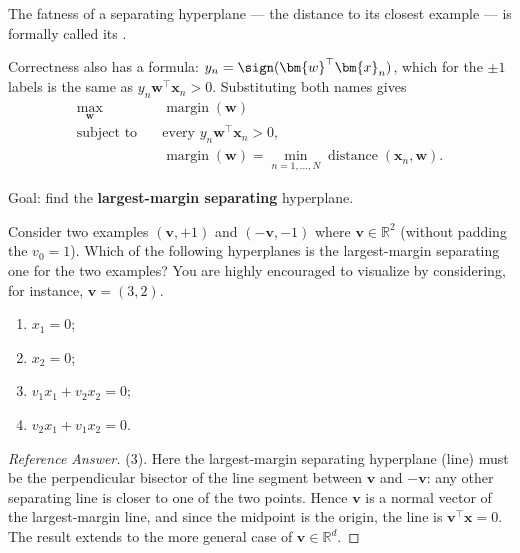 \begin{definition}[Margin]
    The fatness of a separating hyperplane --- the distance to its closest
    example --- is formally called its .
\end{definition}

Correctness also has a formula: \(y_n = \sign(\bm{w}^\top \bm{x}_n)\), which
for the \(\pm 1\) labels is the same as \(y_n \bm{w}^\top \bm{x}_n > 0\).
Substituting both names gives
\[
    \begin{aligned}
        \max_{\bm{w}} \quad & \operatorname{margin}(\bm{w})\\
        \text{subject to} \quad & \text{every } y_n \bm{w}^\top \bm{x}_n >
            0,\\
        & \operatorname{margin}(\bm{w}) = \min_{n=1,\dots,N}
            \operatorname{distance}(\bm{x}_n, \bm{w}).
    \end{aligned}
\]

\begin{moral}
    Goal: find the \textbf{largest-margin separating} hyperplane.
\end{moral}

\begin{exercise}
    Consider two examples \((\bm{v}, +1)\) and \((-\bm{v}, -1)\) where
    \(\bm{v} \in \mathbb{R}^2\) (without padding the \(v_0 = 1\)). Which of
    the following hyperplanes is the largest-margin separating one for the
    two examples? You are highly encouraged to visualize by considering, for
    instance, \(\bm{v} = (3, 2)\).
    \begin{enumerate}[(1)]
        \item \(x_1 = 0\);
        \item \(x_2 = 0\);
        \item \(v_1 x_1 + v_2 x_2 = 0\);
        \item \(v_2 x_1 + v_1 x_2 = 0\).
    \end{enumerate}
\end{exercise}

\begin{proof}[Reference Answer]
    (3). Here the largest-margin separating hyperplane (line) must be the
    perpendicular bisector of the line segment between \(\bm{v}\) and
    \(-\bm{v}\): any other separating line is closer to one of the two
    points. Hence \(\bm{v}\) is a normal vector of the largest-margin line,
    and since the midpoint is the origin, the line is \(\bm{v}^\top \bm{x} =
    0\). The result extends to the more general case of \(\bm{v} \in
    \mathbb{R}^d\).
\end{proof}

